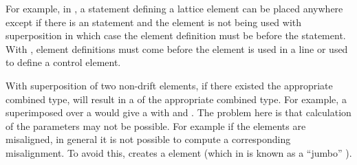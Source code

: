 \begin{description}
For example, in \bmad, a statement defining a lattice element can be placed anywhere
except if there is an  statement and the element is not being used
with superposition in which case the element definition must be before the 
statement. With \accellat, element definitions must come before the element is used in a line
or used to define a control element.
%
\item
With \bmad superposition of two non-drift elements, if there existed the appropriate
combined type, will result in a  of the appropriate combined type. For example,
a  superimposed over a  would give a   with
 and  . The problem here is that calculation of the
 parameters may not be possible. For example if the 
elements are misaligned, in general it is not possible to compute a corresponding 
misalignment. To avoid this, \accellat creates a   element
(which in \bmad is known as a ``jumbo'' ).
%
\end{description}




